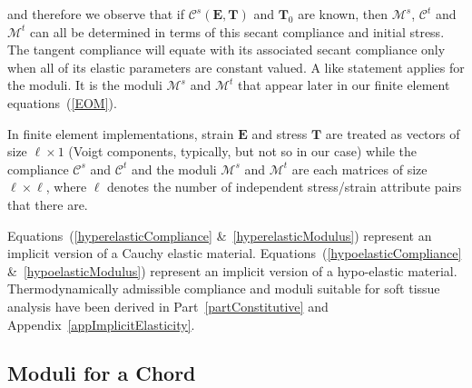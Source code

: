 and therefore we observe that if $\boldsymbol{\mathcal{C}}^s (\boldsymbol{E}, \boldsymbol{T})$ and $\boldsymbol{T}_0$ are known, then $\boldsymbol{\mathcal{M}}^s$, $\boldsymbol{\mathcal{C}}^t$ and $\boldsymbol{\mathcal{M}}^t$ can all be determined in terms of this secant compliance and initial stress.  The tangent compliance will equate with its associated secant compliance only when all of its elastic parameters are constant valued.  A like statement applies for the moduli.  It is the moduli $\boldsymbol{\mathcal{M}}^s$ and $\boldsymbol{\mathcal{M}}^t$ that appear later in our finite element equations~(\ref{EOM}).

In finite element implementations, strain $\boldsymbol{E}$ and stress $\boldsymbol{T}$ are treated as vectors of size $\ell \! \times \! 1$ (Voigt components, typically, but not so in our case) while the compliance $\boldsymbol{\mathcal{C}}^s$ and $\boldsymbol{\mathcal{C}}^t$ and the moduli $\boldsymbol{\mathcal{M}}^s$ and $\boldsymbol{\mathcal{M}}^t$ are each matrices of size $\ell \! \times \! \ell$, where $\ell$ denotes the number of independent stress\slash strain attribute pairs that there are.

Equations~(\ref{hyperelasticCompliance} \&\ \ref{hyperelasticModulus}) represent an implicit version of a Cauchy elastic material. Equations~(\ref{hypoelasticCompliance} \&\ \ref{hypoelasticModulus}) represent an implicit version of a hypo-elastic material.  Thermo\-dynamically admissible compliance and moduli suitable for soft tissue analysis have been derived in Part~\ref{partConstitutive} and Appendix~\ref{appImplicitElasticity}.


\subsection{Moduli for a Chord}

